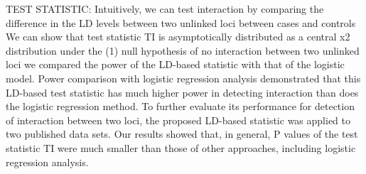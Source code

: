 TEST STATISTIC:  \cite{zhao2006test}
	Intuitively, we can test interaction by comparing the difference in the LD levels between two unlinked loci between cases and controls \cite{zhao2006test}
	We can show that test statistic TI is asymptotically distributed as a central x2 distribution under the (1) null hypothesis of no interaction between two unlinked loci  \cite{zhao2006test}
we compared the power of the LD-based statistic with that of the logistic model.  \cite{zhao2006test}
Power comparison with logistic regression analysis demonstrated that this LD-based test statistic has much higher power in detecting interaction than does the logistic regression method. \cite{zhao2006test}
To further evaluate its performance for detection of interaction between two loci, the proposed LD-based statistic was applied to two published data sets. Our results showed that, in general, P values of the test statistic TI were much smaller than those of other approaches, including logistic regression analysis. \cite{zhao2006test}


